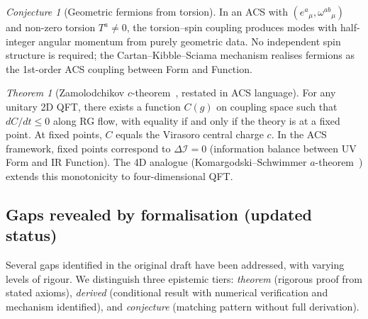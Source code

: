 \documentclass[11pt,a4paper]{article}
\theoremstyle{plain}
\theoremstyle{definition}
\theoremstyle{remark}
\newtheorem*{theorem*}{Theorem}
\newtheorem{conjecture}[theorem]{Conjecture}
\newcommand{\DI}{\Delta\mathcal{I}}
\begin{document}
\begin{conjecture}[Geometric fermions from torsion]\label{conj:fermions}
In an ACS with $(e^a{}_\mu, \omega^{ab}{}_\mu)$ and non-zero torsion 
$T^a \neq 0$, the torsion--spin coupling produces modes with half-integer 
angular momentum from purely geometric data.  No independent spin structure 
is required; the Cartan--Kibble--Sciama mechanism realises fermions as the 
1st-order ACS coupling between Form and Function.
\end{conjecture}

\begin{theorem*}[Zamolodchikov $c$-theorem~\cite{Zamolodchikov1986}, restated in ACS language]\label{thm:c-theorem}
For any unitary 2D QFT, there exists a function $C(g)$ on coupling space such that $dC/dt \leq 0$ along RG flow, with equality if and only if the theory is at a fixed point.  At fixed points, $C$ equals the Virasoro central charge $c$.  In the ACS framework, fixed points correspond to $\DI = 0$ (information balance between UV Form and IR Function).  The 4D analogue (Komargodski--Schwimmer $a$-theorem~\cite{KomargodskiSchwimmer2011}) extends this monotonicity to four-dimensional QFT.
\end{theorem*}

\subsection{Gaps revealed by formalisation (updated status)}

Several gaps identified in the original draft have been addressed,
with varying levels of rigour.  We distinguish three epistemic tiers:
\emph{theorem} (rigorous proof from stated axioms),
\emph{derived} (conditional result with numerical verification
and mechanism identified), and \emph{conjecture} (matching pattern
without full derivation).
\end{document}

